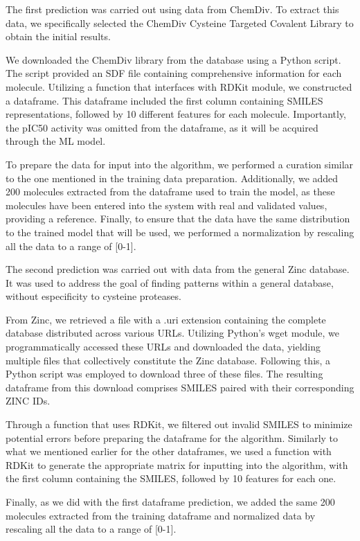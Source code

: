\documentclass[final,times,twocolumn,article]{elsarticle}
\begin{document}
The first prediction was carried out using data from ChemDiv. To extract this data, we specifically selected the ChemDiv Cysteine Targeted Covalent Library to obtain the initial results. 

We downloaded the ChemDiv library from the database using a Python script. The script provided an SDF file containing comprehensive information for each molecule. Utilizing a function that interfaces with RDKit module, we constructed a dataframe. This dataframe included the first column containing SMILES representations, followed by 10 different features for each molecule. Importantly, the pIC50 activity was omitted from the dataframe, as it will be acquired through the ML model.

To prepare the data for input into the algorithm, we performed a curation similar to the one mentioned in the training data preparation. Additionally, we added 200 molecules extracted from the dataframe used to train the model, as these molecules have been entered into the system with real and validated values, providing a reference. Finally, to ensure that the data have the same distribution to the trained model that will be used, we performed a normalization by rescaling all the data to a range of [0-1]. 

The second prediction was carried out with data from the general Zinc database. It was used to address the goal of finding patterns within a general database, without especificity to cysteine proteases. 

From Zinc, we retrieved a file with a .uri extension containing the complete database distributed across various URLs. Utilizing Python's wget module, we programmatically accessed these URLs and downloaded the data, yielding multiple files that collectively constitute the Zinc database. Following this, a Python script was employed to download three of these files. The resulting dataframe from this download comprises SMILES paired with their corresponding ZINC IDs. 

Through a function that uses RDKit, we filtered out invalid SMILES to minimize potential errors before preparing the dataframe for the algorithm. Similarly to what we mentioned earlier for the other dataframes, we used a function with RDKit to generate the appropriate matrix for inputting into the algorithm, with the first column containing the SMILES, followed by 10 features for each one. 

Finally, as we did with the first dataframe prediction, we added the same 200 molecules extracted from the training dataframe and normalized data by rescaling all the data to a range of [0-1].
\end{document}
